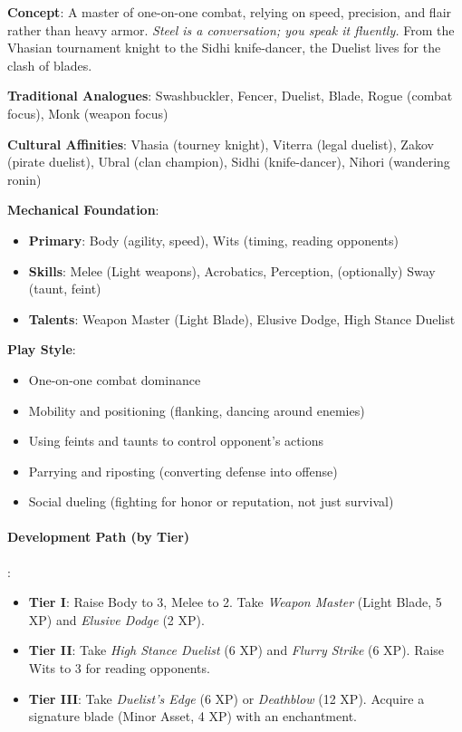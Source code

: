 \textbf{Concept}: A master of one-on-one combat, relying on speed, precision, and flair rather than heavy armor. \emph{Steel is a conversation; you speak it fluently.} From the Vhasian tournament knight to the Sidhi knife-dancer, the Duelist lives for the clash of blades.

\textbf{Traditional Analogues}: Swashbuckler, Fencer, Duelist, Blade, Rogue (combat focus), Monk (weapon focus)

\textbf{Cultural Affinities}: Vhasia (tourney knight), Viterra (legal duelist), Zakov (pirate duelist), Ubral (clan champion), Sidhi (knife-dancer), Nihori (wandering ronin)

\textbf{Mechanical Foundation}:
\begin{itemize}
\item \textbf{Primary}: Body (agility, speed), Wits (timing, reading opponents)
\item \textbf{Skills}: Melee (Light weapons), Acrobatics, Perception, (optionally) Sway (taunt, feint)
\item \textbf{Talents}: Weapon Master (Light Blade), Elusive Dodge, High Stance Duelist
\end{itemize}

\textbf{Play Style}:
\begin{itemize}
\item One-on-one combat dominance
\item Mobility and positioning (flanking, dancing around enemies)
\item Using feints and taunts to control opponent's actions
\item Parrying and riposting (converting defense into offense)
\item Social dueling (fighting for honor or reputation, not just survival)
\end{itemize}

\paragraph{Development Path (by Tier)}:
\begin{itemize}
\item \textbf{Tier I}: Raise Body to 3, Melee to 2. Take \emph{Weapon Master} (Light Blade, 5 XP) and \emph{Elusive Dodge} (2 XP).
\item \textbf{Tier II}: Take \emph{High Stance Duelist} (6 XP) and \emph{Flurry Strike} (6 XP). Raise Wits to 3 for reading opponents.
\item \textbf{Tier III}: Take \emph{Duelist's Edge} (6 XP) or \emph{Deathblow} (12 XP). Acquire a signature blade (Minor Asset, 4 XP) with an enchantment.
\end{itemize}

